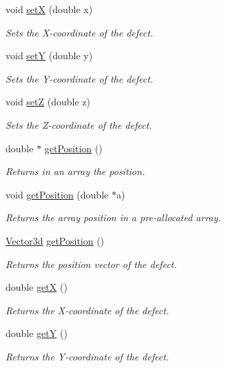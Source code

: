 \begin{DoxyCompactItemize}
void \hyperlink{classDefect_a5a65f73da6a572d9e7109b31239e441d}{set\-X} (double x)
\begin{DoxyCompactList}\small\item\em Sets the X-\/coordinate of the defect. \end{DoxyCompactList}\item 
void \hyperlink{classDefect_a268606391a4eaee3de029d2005648b6f}{set\-Y} (double y)
\begin{DoxyCompactList}\small\item\em Sets the Y-\/coordinate of the defect. \end{DoxyCompactList}\item 
void \hyperlink{classDefect_abb0b16c44a1b04d782f5c5f598b49d5b}{set\-Z} (double z)
\begin{DoxyCompactList}\small\item\em Sets the Z-\/coordinate of the defect. \end{DoxyCompactList}\item 
double $\ast$ \hyperlink{classDefect_a270caed3561fa5fa284af6427b6ca2e4}{get\-Position} ()
\begin{DoxyCompactList}\small\item\em Returns in an array the position. \end{DoxyCompactList}\item 
void \hyperlink{classDefect_aace5c752b85c368631746abc3d5bd714}{get\-Position} (double $\ast$a)
\begin{DoxyCompactList}\small\item\em Returns the array position in a pre-\/allocated array. \end{DoxyCompactList}\item 
\hyperlink{classVector3d}{Vector3d} \hyperlink{classDefect_a270caed3561fa5fa284af6427b6ca2e4}{get\-Position} ()
\begin{DoxyCompactList}\small\item\em Returns the position vector of the defect. \end{DoxyCompactList}\item 
double \hyperlink{classDefect_a01b96c453c13db82b5835682e1849dc0}{get\-X} ()
\begin{DoxyCompactList}\small\item\em Returns the X-\/coordinate of the defect. \end{DoxyCompactList}\item 
double \hyperlink{classDefect_a9ea8df3b4c621762a327813056e63911}{get\-Y} ()
\begin{DoxyCompactList}\small\item\em Returns the Y-\/coordinate of the defect. \end{DoxyCompactList}\item 

\end{DoxyCompactItemize}
